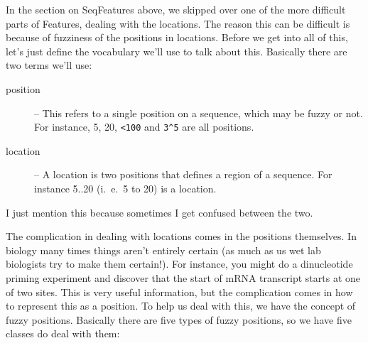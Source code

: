 \documentclass{report}
\begin{document}
In the section on SeqFeatures above, we skipped over one of the more difficult parts of Features, dealing with the locations. The reason this can be difficult is because of fuzziness of the positions in locations. Before we get into all of this, let's just define the vocabulary we'll use to talk about this. Basically there are two terms we'll use:

\begin{description}
  \item[position] -- This refers to a single position on a sequence, 
  which may be fuzzy or not. For instance, 5, 20, \verb|<100| and 
  \verb|3^5| are all positions.

  \item[location] -- A location is two positions that defines a region of a sequence. For instance 5..20 (i.~e.~5 to 20) is a location.
\end{description}

I just mention this because sometimes I get confused between the two.


The complication in dealing with locations comes in the positions themselves. In biology many times things aren't entirely certain (as much as us wet lab biologists try to make them certain!). For instance, you might do a dinucleotide priming experiment and discover that the start of mRNA transcript starts at one of two sites. This is very useful information, but the complication comes in how to represent this as a position. To help us deal with this, we have the concept of fuzzy positions. Basically there are five types of fuzzy positions, so we have five classes do deal with them:
\end{document}
